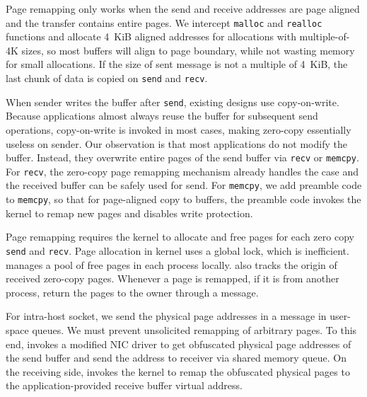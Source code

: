 Page remapping only works when the send and receive addresses are page aligned and the transfer contains entire pages.
We intercept \texttt{malloc} and \texttt{realloc} functions and allocate 4~KiB aligned addresses for allocations with multiple-of-4K sizes, so most buffers will align to page boundary, while not wasting memory for small allocations.
If the size of sent message is not a multiple of 4~KiB, the last chunk of data is copied on \texttt{send} and \texttt{recv}.



When sender writes the buffer after \texttt{send}, existing designs use copy-on-write. %
Because applications almost always reuse the buffer for subsequent send operations, copy-on-write is invoked in most cases, making zero-copy essentially useless on sender.
Our observation is that most applications do not modify the buffer. Instead, they overwrite entire pages of the send buffer via \texttt{recv} or \texttt{memcpy}. %
For \texttt{recv}, the zero-copy page remapping mechanism already handles the case and the received buffer can be safely used for send. 
For \texttt{memcpy}, we add preamble code to \texttt{memcpy}, so that
for page-aligned copy to \libipc{} buffers, the preamble code invokes the kernel to remap new pages and disables write protection.

Page remapping requires the kernel to allocate and free pages for each zero copy \texttt{send} and \texttt{recv}. 
Page allocation in kernel uses a global lock, which is inefficient. \libipc{} manages a pool of free pages in each process locally.
\libipc{} also tracks the origin of received zero-copy pages.
Whenever a page is remapped, if it is from another process, \libipc{} return the pages to the owner through a message.

For intra-host socket, we send the physical page addresses in a message in user-space queues.
We must prevent unsolicited remapping of arbitrary pages.
To this end, \libipc{} invokes a modified NIC driver to 
get obfuscated physical page addresses of the send buffer and send the address to receiver via shared memory queue.
On the receiving side, \libipc{} invokes the kernel to remap the obfuscated physical pages to the application-provided receive buffer virtual address.

